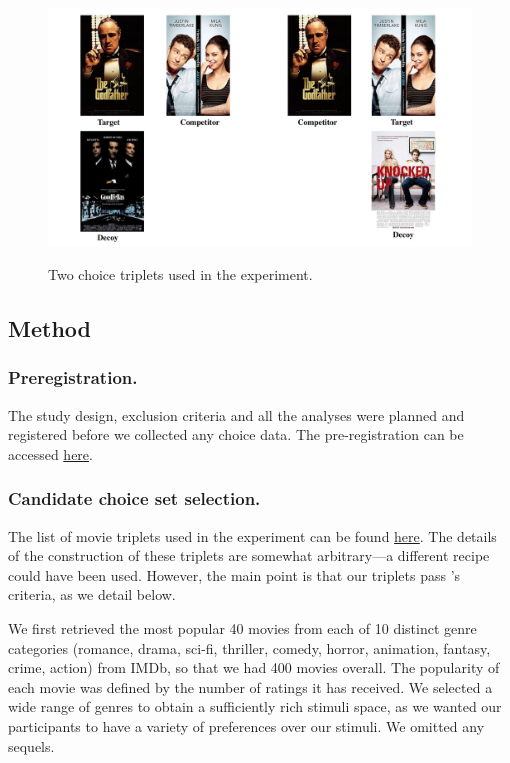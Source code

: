 \documentclass[12pt, a4paper]{article}
\begin{document}
\begin{figure}
\centering
		 \caption{Two choice triplets used in the experiment.}
\includegraphics[width=1\textwidth]{figure1.pdf}
\label{fig:quadruplets}
\end{figure}

\subsection*{Method}

\subsubsection*{Preregistration.}
The study design, exclusion criteria and all the analyses were planned and registered before we collected any choice data. The pre-registration can be accessed \href{https://osf.io/fme6c/?view_only=31da4193689f4247a76af93b2f98fcef}{here}.

\subsubsection*{Candidate choice set selection.}

The list of movie triplets used in the experiment can be found \href{https://osf.io/fme6c/?view_only=31da4193689f4247a76af93b2f98fcef}{here}. The details of the construction of these triplets are somewhat arbitrary---a different recipe could have been used. However, the main point is that our triplets pass \citeauthor{Huber2014}'s \citeyear{Huber2014} criteria, as we detail below.

We first retrieved the most popular 40 movies from each of 10 distinct genre categories (romance, drama, sci-fi, thriller, comedy, horror, animation, fantasy, crime, action) from IMDb, so that we had 400 movies overall. The popularity of each movie was defined by the number of ratings it has received. We selected a wide range of genres to obtain a sufficiently rich stimuli space, as we wanted our participants to have a variety of preferences over our stimuli. We omitted any sequels.
\end{document}
